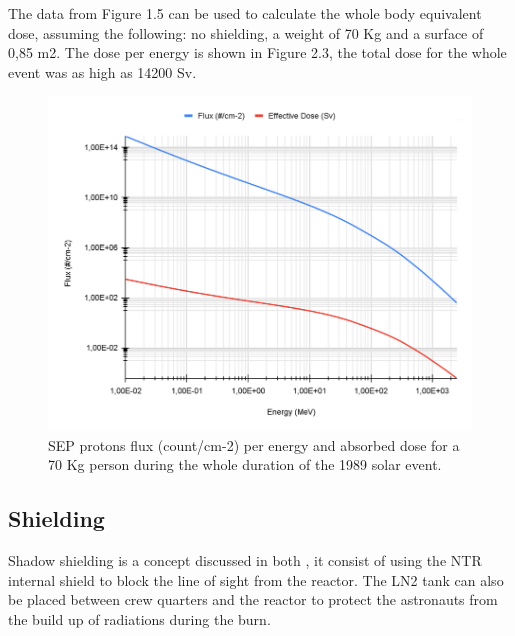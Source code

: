 \documentclass[12pt,a4paper]{report}
\begin{document}
The data from Figure 1.5 can be used to calculate the whole body equivalent dose, assuming the following: no shielding, a weight of 70 Kg and a surface of 0,85 m2. The dose per energy is shown in Figure 2.3, the total dose for the whole event was as high as 14200 Sv.

\begin{figure}[hbtp]
\centering
\includegraphics[width=.8\textwidth]{img/ED 1989.png}
\caption{SEP protons flux (count/cm-2) per energy and absorbed dose for a 70 Kg person during the whole duration of the 1989 solar event.}
\end{figure}

\subsection{Shielding}


Shadow shielding is a concept discussed in both \citet{mclaren2010,hoffman1997}, it consist of using the NTR internal shield to block the line of sight from the reactor. The LN2 tank can also be placed between crew quarters and the reactor to protect the astronauts from the build up of radiations during the burn.\\
\end{document}
